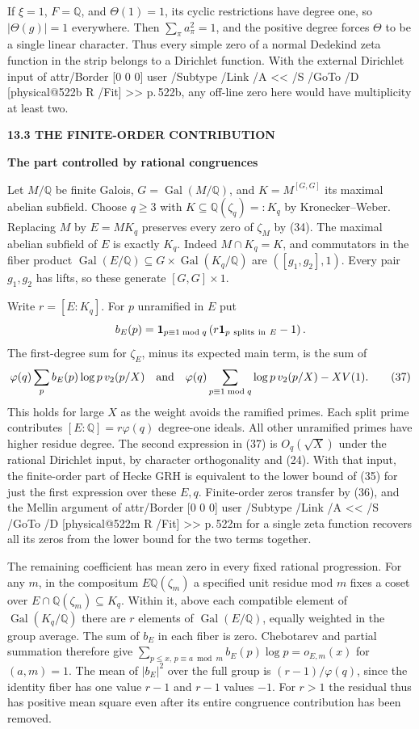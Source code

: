\documentclass[11pt,letterpaper]{article}
\makeatletter
\newcommand{\rightmarktext}{}
\newcommand{\printfolio}{}
\newcommand{\leaf}[4]{\clearpage\gdef\printfolio{#1}\gdef\rightmarktext{#2}%
  {\small\sffamily\bfseries\color{ink}#3\par}\vspace{3pt}%
  {\LARGE\bfseries #4\par}\vspace{5pt}}
\newcommand{\Q}{\mathbb Q}
\newcommand{\MusicPDFPageRef}[1]{\pdfpageref\csname physical@#1\endcsname\space\space 0 R}
\newcommand{\pagelink}[2]{\leavevmode\pdfstartlink attr{/Border [0 0 0]} user{%
  /Subtype /Link /A << /S /GoTo /D [\MusicPDFPageRef{#1} /Fit] >>}%
  {\color{ink}#2}\pdfendlink}
\newcommand{\pg}[1]{\pagelink{#1}{p.\,#1}}
\makeatother
\begin{document}
If $\xi=1$, $F=\Q$, and $\Theta(1)=1$, its cyclic restrictions have
degree one, so $|\Theta(g)|=1$ everywhere. Then
$\sum_\pi a_\pi^2=1$, and the positive degree forces $\Theta$ to be
a single linear character. Thus every simple zero of a normal Dedekind
zeta function in the strip belongs to a Dirichlet function. With the
external Dirichlet input of \pg{522b}, any off-line zero here would
have multiplicity at least two.

\leaf{522o}{Completely split primes}{13.3 \quad THE FINITE-ORDER CONTRIBUTION}{The part controlled by rational congruences}
Let $M/\Q$ be finite Galois, $G=\operatorname{Gal}(M/\Q)$, and
$K=M^{[G,G]}$ its maximal abelian subfield. Choose $q\ge3$ with
$K\subseteq\Q(\zeta_q)=:K_q$ by Kronecker--Weber. Replacing $M$ by
$E=MK_q$ preserves every zero of $\zeta_M$ by (34). The maximal
abelian subfield of $E$ is exactly $K_q$. Indeed $M\cap K_q=K$, and
commutators in the fiber product
$\operatorname{Gal}(E/\Q)\subseteq G\times\operatorname{Gal}(K_q/\Q)$
are $([g_1,g_2],1)$. Every pair $g_1,g_2$ has lifts, so these generate
$[G,G]\times1$.

Write $r=[E:K_q]$. For $p$ unramified in $E$ put
\[
   b_E(p)=\mathbf1_{p\equiv1\bmod q}
                    \left(r\mathbf1_{p\ {\rm splits\ in}\ E}-1\right).
\]
The first-degree sum for $\zeta_E$, minus its expected main term,
is the sum of
\[
   \varphi(q)\sum_p b_E(p)\log p\,v_2(p/X)
   \quad\hbox{and}\quad
   \varphi(q)\sum_{p\equiv1\bmod q}\log p\,v_2(p/X)-X V(1).
 \tag{37}
\]
This holds for large $X$ as the weight avoids the ramified primes.
Each split prime contributes $[E:\Q]=r\varphi(q)$ degree-one ideals.
All other unramified primes have higher residue degree. The second
expression in (37) is $O_q(\sqrt X)$ under the rational Dirichlet input,
by character orthogonality and (24). With that input, the finite-order
part of Hecke GRH is equivalent to the lower bound of (35) for just
the first expression over these $E,q$. Finite-order zeros transfer by
(36), and the Mellin argument of \pg{522m} for a single zeta function
recovers all its zeros from the lower bound for the two terms together.

The remaining coefficient has mean zero in every fixed rational
progression. For any $m$, in the compositum $E\Q(\zeta_m)$ a specified
unit residue mod $m$ fixes a coset over $E\cap\Q(\zeta_m)\subseteq K_q$.
Within it, above each compatible element of $\operatorname{Gal}(K_q/\Q)$
there are $r$ elements of $\operatorname{Gal}(E/\Q)$, equally weighted
in the group average. The sum of $b_E$ in each fiber is zero.
Chebotarev and partial summation therefore give
$\sum_{p\le x,\,p\equiv a\bmod m} b_E(p)\log p=o_{E,m}(x)$ for
$(a,m)=1$. The mean of $|b_E|^2$ over the full group is
$(r-1)/\varphi(q)$, since the identity fiber has one value $r-1$ and
$r-1$ values $-1$. For $r>1$ the residual thus has positive mean
square even after its entire congruence contribution has been removed.
\end{document}
